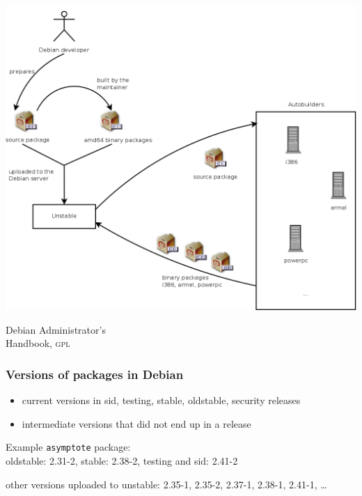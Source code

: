 \documentclass[hyperref]{beamer}
\newcommand{\acro}[1]{\textsc{\MakeLowercase{#1}}}
\def\bis{\\[\bigskipamount]}
\begin{document}
\begin{frame}
  \vspace{-0.5cm}
  \begin{center}
    \includegraphics[height=0.9\textheight]{autobuilder.png}
  \end{center}
  \vspace{-2cm}
  \small Debian Administrator's\\
  Handbook, \acro{GPL}
\end{frame}

\begin{frame}
  \frametitle{Versions of packages in Debian}
  \begin{itemize}
  \item current versions in sid, testing, stable, oldstable, security
    releases\bis
  \item intermediate versions that did not end up in a release
  \end{itemize}
  \begin{block}{Example}
    \texttt{asymptote} package:\\
    oldstable: 2.31-2, stable: 2.38-2, testing and sid: 2.41-2

    other versions uploaded to unstable: 2.35-1, 2.35-2, 2.37-1,
    2.38-1, 2.41-1, \ldots
  \end{block}
\end{frame}
\end{document}
